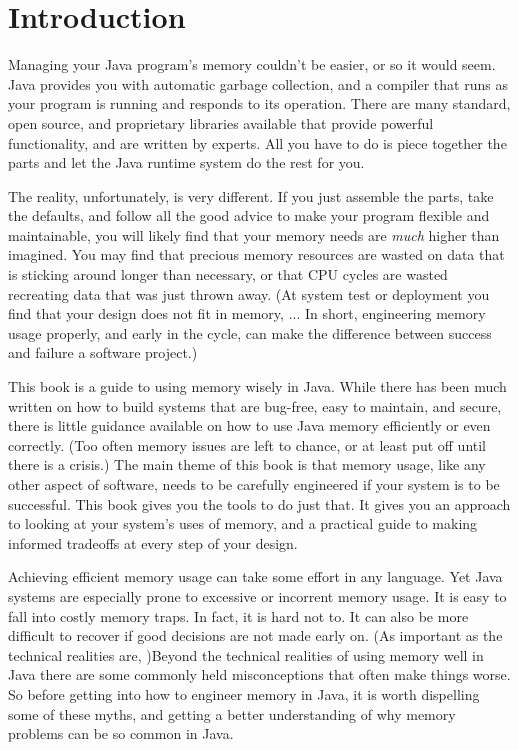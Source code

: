 
\chapter{Introduction}

Managing your Java program's memory couldn't be easier, or so it would
seem. Java provides you with automatic garbage collection, and a compiler that
runs as your program is running and responds to its operation. There are many
standard, open source, and proprietary libraries available that provide powerful
functionality, and are written by experts. All you have to do is piece together
the parts and let the Java runtime system do the rest for you.

The reality, unfortunately, is very different. If you just assemble the parts, take
the defaults, and follow all the good advice to make your
program flexible and maintainable, you will likely find that your memory needs are
\emph{much} higher than imagined. You may find that precious memory resources
are wasted on data that is sticking around longer than necessary, or that
CPU cycles are wasted recreating data that was just thrown away. 
(At system test or deployment you find that your design does not fit in memory,
... In short, engineering memory usage properly, and early in the cycle, can make
the difference between success and failure a software project.)

This book is a guide to using memory wisely in Java.  While there has been much
written on how to build systems that are bug-free, easy to maintain, and secure,
there is little guidance available on how to use Java memory efficiently
or even correctly. (Too often memory issues are left to chance, or at least
put off until there is a crisis.) The main theme of this book is that
memory usage, like any other aspect of software, needs to be carefully engineered if your system is
to be successful. This book gives you the tools to do just that.  It gives you
an approach to looking at your system's uses of memory, and a practical guide
to making informed tradeoffs at every step of your design. 

Achieving efficient memory usage can take some effort in any language. Yet 
Java systems are especially prone to excessive or incorrent memory usage. 
It is easy to fall into costly memory traps. In fact, it is
hard not to. It can also be more difficult to recover if good decisions are not made early on. 
(As important as the technical realities are, )Beyond the technical realities of
using memory well in Java there are some commonly held misconceptions that often make things worse. So
before getting into how to engineer memory in Java, it is worth dispelling some
of these myths, and getting a better understanding of why memory problems
can be so common in Java.

